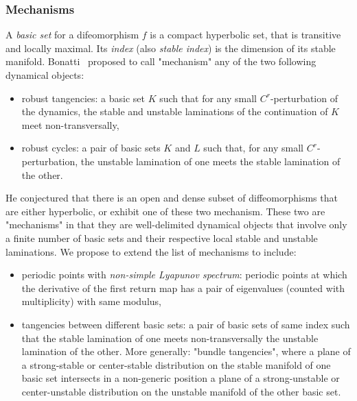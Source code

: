 \documentclass[11pt, a4paper]{amsart}
\theoremstyle{plain}
\theoremstyle{definition}
\theoremstyle{remark}
\numberwithin{equation}{section}         %
\begin{document}
\subsubsection{Mechanisms}
A {\em basic set} for a difeomorphism $f$ is a compact  hyperbolic set, that is transitive and locally maximal. Its {\em index} (also {\em stable index}) is the dimension of its stable manifold. Bonatti~\cite{B} proposed to call "mechanism" any of the two following dynamical objects: 
\begin{itemize}
\item robust tangencies: a basic set  $K$ such that for any small $C^r$-perturbation of the dynamics, the stable and unstable laminations of the continuation of $K$ meet non-transversally,
\item robust cycles: a pair of basic sets $K$ and $L$ such that, for any small $C^r$-perturbation, the unstable lamination of one meets the stable lamination of the other.
\end{itemize}
He conjectured that there is an open and dense subset of diffeomorphisms that are either hyperbolic, or exhibit one of these two mechanism. 
These two are "mechanisms" in that they are well-delimited dynamical objects that involve only a finite number of basic sets and their respective local stable and unstable laminations. 
We propose to extend the list of mechanisms to include:
\begin{itemize}
\item periodic points with {\em non-simple Lyapunov spectrum}: periodic points at which the derivative of the first return map has a pair of eigenvalues (counted with multiplicity) with same modulus,
\item tangencies between different basic sets: a pair of basic sets of same index such that the stable lamination of one meets non-transversally the unstable lamination of the other. More generally: "bundle tangencies", where a plane of a strong-stable or center-stable distribution on the stable manifold of one basic set intersects in a non-generic position a plane of a strong-unstable or center-unstable distribution on the unstable manifold of the other basic set. 
\end{itemize}
\end{document}
